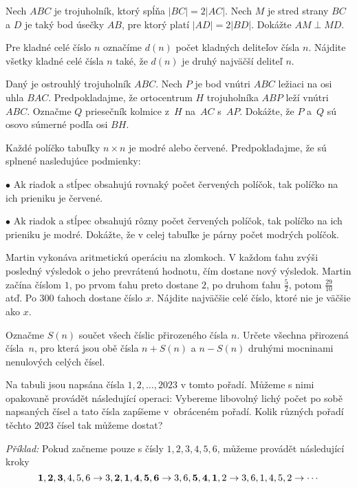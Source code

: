 {%
Nech $ABC$ je trojuholník, ktorý spĺňa $|BC|=2|AC|$. Nech $M$ je stred strany $BC$ a $D$ je taký bod úsečky $AB$, pre ktorý platí $|AD|=2|BD|$. Dokážte $AM \perp MD$.}

{%
Pre kladné celé číslo $n$ označíme $d(n)$ počet kladných deliteľov čísla $n$. Nájdite všetky kladné celé čísla $n$ také, že $d(n)$ je druhý najväčší deliteľ $n$.}

{%
Daný je ostrouhlý trojuholník $ABC$. Nech $P$ je bod vnútri $ABC$ ležiaci na osi uhla $BAC$. Predpokladajme, že ortocentrum $H$ trojuholníka $ABP$ leží vnútri $ABC$. Označme $Q$ priesečník kolmice z~$H$ na~$AC$ s~$AP$. Dokážte, že $P$ a~$Q$ sú osovo súmerné podľa osi $BH$.}

{%
Každé políčko tabuľky $n\times n$ je modré alebo červené. Predpokladajme, že sú splnené nasledujúce podmienky:
\item{$\bullet$} Ak riadok a stĺpec obsahujú rovnaký počet červených políčok, tak políčko na ich prieniku je červené.
\item{$\bullet$} Ak riadok a stĺpec obsahujú rôzny počet červených políčok, tak políčko na ich prieniku je modré.\endgraf\noindent
Dokážte, že v celej tabuľke je párny počet modrých políčok.}

{%
Martin vykonáva aritmetickú operáciu na zlomkoch. V každom ťahu zvýši posledný výsledok o jeho prevrátenú hodnotu, čím dostane nový výsledok. Martin začína číslom $1$, po prvom ťahu preto dostane $2$, po druhom ťahu $\frac52$, potom $\frac{29}{10}$ atď. Po $300$ ťahoch dostane číslo $x$. Nájdite najväčšie celé číslo, ktoré nie je väčšie ako $x$.}

{%
Označme $S(n)$ součet všech číslic přirozeného čísla $n$. Určete všechna přirozená čísla~$n$, pro která jsou obě čísla $n+S(n)$ a $n-S(n)$ druhými mocninami nenulových celých čísel.}

{%
Na tabuli jsou napsána čísla $1,2,\ldots,2023$ v tomto pořadí. Můžeme s nimi opakovaně provádět následující operaci: Vybereme libovolný lichý počet po sobě napsaných čísel a tato čísla zapíšeme v~obráceném pořadí. Kolik různých pořadí těchto $2023$ čísel tak můžeme dostat?

\emph{Příklad:} Pokud začneme pouze s čísly $1,2,3,4,5,6$, můžeme provádět následující kroky
 $$\bold{1},\bold{2},\bold{3},4,5,6 \rightarrow 3,\bold2,\bold1,\bold4,\bold5,\bold6 \rightarrow 3,6,\bold5,\bold4,\bold1,2 \rightarrow 3,6,1,4,5,2 \rightarrow \cdots$$}

